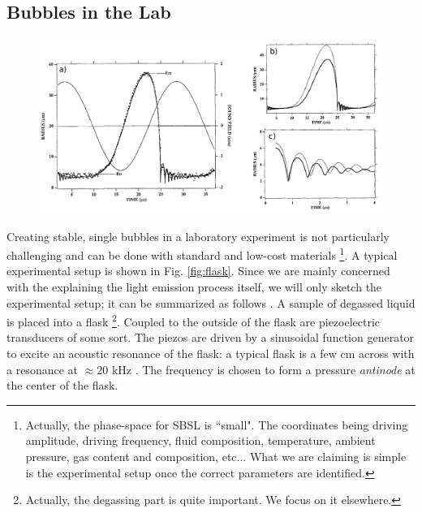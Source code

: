 \documentclass[rmp,aps,nofootinbib,superscriptaddress,floatfix]{revtex4-2}
\begin{document}
\subsection{Bubbles in the Lab}
\begin{figure}
\includegraphics[width=0.9\linewidth]{figs/bubble_radius_1.pdf}
    \caption{\cite{barber1997defining,barber1992light}}
\label{fig:bubble_radius_1}
\end{figure}

Creating stable, single bubbles in a laboratory experiment is not particularly challenging and can be done with standard and low-cost materials \footnote{Actually, the phase-space for SBSL is ``small". The coordinates being driving amplitude, driving frequency, fluid composition, temperature, ambient pressure, gas content and composition, etc... What we are claiming is simple is the experimental setup once the correct parameters are identified.}. A typical experimental setup is shown in Fig. \ref{fig:flask}. Since we are mainly concerned with the explaining the light emission process itself, we will only sketch the experimental setup; it can be summarized as follows \cite{lentz1995mie,gaitan1990experimental,gaitan1992sonoluminescence,gompf2000mie,brenner2002single,yasui2018acoustic,brennen2014cavitation,suslick2008inside}. A sample of degassed liquid is placed into a flask \footnote{Actually, the degassing part is quite important. We focus on it elsewhere.}. Coupled to the outside of the flask are piezoelectric transducers of some sort. The piezos are driven by a sinusoidal function generator to excite an acoustic resonance of the flask: a typical flask is a few cm across with a resonance at $\approx 20$ kHz \cite{brenner2002single}. The frequency is chosen to form a pressure \emph{antinode} at the center of the flask.
\end{document}
